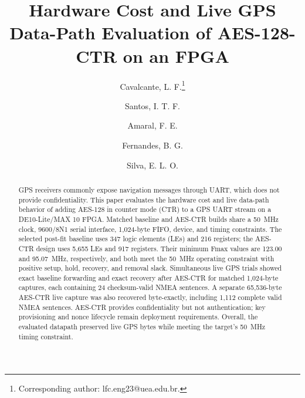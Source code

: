 \documentclass[runningheads]{llncs}
\newcommand{\BaselineLE}{347}
\newcommand{\BaselineReg}{216}
\newcommand{\BaselineFmax}{123.00}
\newcommand{\SecureLEPrint}{5,655}
\newcommand{\SecureReg}{917}
\newcommand{\SecureFmax}{95.07}
\begin{document}
\title{Hardware Cost and Live GPS Data-Path Evaluation of AES-128-CTR on an FPGA}
\author{Cavalcante, L. F.\thanks{Corresponding author: lfc.eng23@uea.edu.br.} \and
Santos, I. T. F. \and
Amaral, F. E. \and
Fernandes, B. G. \and
Silva, E. L. O.}

\maketitle

\begin{abstract}
GPS receivers commonly expose navigation messages through UART, which does not provide confidentiality. This paper evaluates the hardware cost and live data-path behavior of adding AES-128 in counter mode (CTR) to a GPS UART stream on a DE10-Lite/MAX 10 FPGA. Matched baseline and AES-CTR builds share a 50~MHz clock, 9600/8N1 serial interface, 1,024-byte FIFO, device, and timing constraints. The selected post-fit baseline uses \BaselineLE{} logic elements (LEs) and \BaselineReg{} registers; the AES-CTR design uses \SecureLEPrint{} LEs and \SecureReg{} registers. Their minimum Fmax values are \BaselineFmax{} and \SecureFmax{}~MHz, respectively, and both meet the 50~MHz operating constraint with positive setup, hold, recovery, and removal slack. Simultaneous live GPS trials showed exact baseline forwarding and exact recovery after AES-CTR for matched 1,024-byte captures, each containing 24 checksum-valid NMEA sentences. A separate 65,536-byte AES-CTR live capture was also recovered byte-exactly, including 1,112 complete valid NMEA sentences. AES-CTR provides confidentiality but not authentication; key provisioning and nonce lifecycle remain deployment requirements. Overall, the evaluated datapath preserved live GPS bytes while meeting the target's 50~MHz timing constraint.
\end{abstract}
\end{document}
